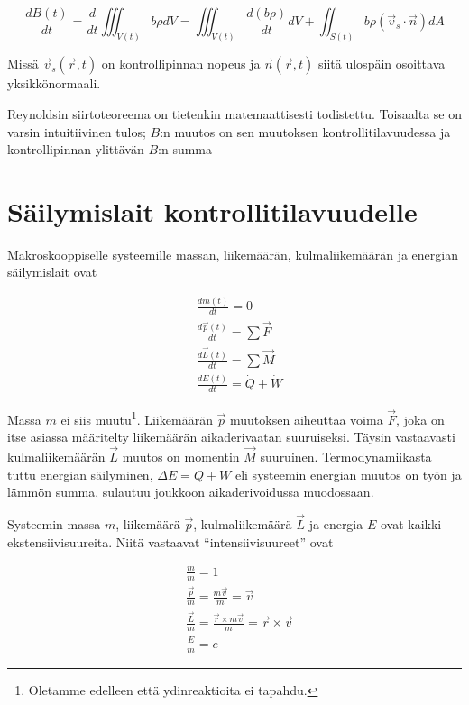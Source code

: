 \documentclass[12pt,a4paper,finnish]{book}
\begin{document}
\begin{framed}
 \begin{equation}
    \label{eq:RTT}
    \frac{dB(t)}{dt} = \frac{d}{dt}\iiint_{V(t)} b\rho dV
      = \iiint_{V(t)}\frac{d( b\rho)}{dt}dV 
	+ \iint_{S(t)} b\rho(\vec{v}_s \cdot \vec{n})dA
 \end{equation}
\end{framed}

Missä $\vec{v}_s(\vec{r}, t)$ on kontrollipinnan nopeus ja $\vec{n}(\vec{r}, t)$ siitä ulospäin osoittava 
yksikkönormaali.

Reynoldsin siirtoteoreema on tietenkin matemaattisesti todistettu. Toisaalta se on varsin intuitiivinen tulos;
$B$:n muutos on sen muutoksen kontrollitilavuudessa ja kontrollipinnan ylittävän $B$:n summa

\section{Säilymislait kontrollitilavuudelle}

Makroskooppiselle systeemille massan, liikemäärän, kulmaliikemäärän ja energian säilymislait ovat

\begin{align}
 \label{eq:V-sailymislait1}
 &\frac{dm(t)}{dt} = 0\\
 &\frac{d\vec{p}(t)}{dt} = \sum \vec{F}\\
 &\frac{d\vec{L}(t)}{dt} = \sum \vec{M}\\
 \label{eq:V-sailymislait4}
 &\frac{dE(t)}{dt} = \dot{Q} + \dot{W}
\end{align}

Massa $m$ ei siis muutu\footnote{Oletamme edelleen että ydinreaktioita ei tapahdu.}. Liikemäärän $\vec{p}$ muutoksen 
aiheuttaa voima $\vec{F}$, joka on itse asiassa määritelty liikemäärän aikaderivaatan suuruiseksi. Täysin vastaavasti 
kulmaliikemäärän $\vec{L}$ muutos on momentin $\vec{M}$ suuruinen. Termodynamiikasta tuttu energian säilyminen, 
$\Delta E = Q + W$ eli systeemin energian muutos on työn ja lämmön summa, sulautuu joukkoon aikaderivoidussa muodossaan.

Systeemin massa $m$, liikemäärä $\vec{p}$, kulmaliikemäärä $\vec{L}$ ja energia $E$ ovat kaikki ekstensiivisuureita. 
Niitä vastaavat ``intensiivisuureet'' ovat

\begin{align}
 &\frac{m}{m} = 1\\
 &\frac{\vec{p}}{m} = \frac{m\vec{v}}{m} = \vec{v}\\
 &\frac{\vec{L}}{m} = \frac{\vec{r} \times m \vec{v}}{m} = \vec{r} \times \vec{v}\\
 &\frac{E}{m} = e 
\end{align}
\end{document}
